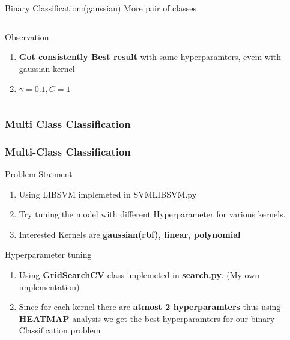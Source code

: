 \documentclass[12pt,t]{beamer}
\begin{document}
\begin{frame}[t]{Binary Classification:(gaussian) More pair of classes}
\begin{columns}
\begin{column}[T]{0.66\linewidth}
\begin{block}{Observation}
\begin{enumerate}
                    \item \textbf{Got consistently Best result} with same hyperparamters, evem with gaussian kernel
                 
                    \item $\gamma =0.1 , C=1$
                \end{enumerate}
            \end{block}
        \end{column}
    \end{columns}
        
\end{frame}



\subsubsection{Multi Class Classification}
\begin{frame}
    \frametitle{Multi-Class Classification}
    \scriptsize
    \begin{block}{Problem Statment}
        \begin{enumerate}
            \item Using LIBSVM implemeted in SVMLIBSVM.py
            \item Try tuning the model with different Hyperparameter for various kernels.
            \item Interested Kernels are \textbf{gaussian(rbf), linear, polynomial}
        \end{enumerate}

        
    \end{block}
    \begin{block}{Hyperparameter tuning}
        \begin{enumerate}
            \item Using \textbf{GridSearchCV} class implemeted in \textbf{search.py}. (My own implementation)
            \item Since for each kernel there are \textbf{atmost 2 hyperparamters} thus using \textbf{HEATMAP} analysis 
                we get the best hyperparamters for our binary Classification problem
        \end{enumerate}
    \end{block}
    

\end{frame}
\end{document}
